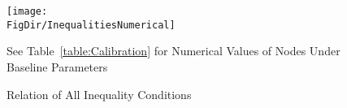 \begin{figure}[h]
  \centerline{
    \texttt{[image: \\FigDir/InequalitiesNumerical]}
  }
  \caption{Relation of All Inequality Conditions} \label{fig:InequalitiesNumerical}
\centerline{See Table~\ref{table:Calibration} for Numerical Values of Nodes Under Baseline Parameters}
\end{figure}
